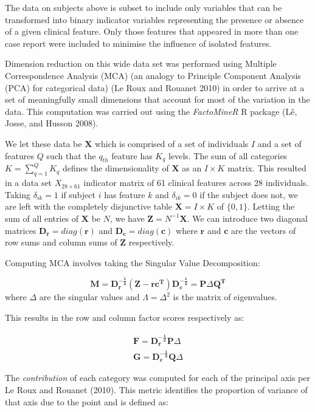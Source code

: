 \documentclass[
  letterpaper,
  DIV=11,
  numbers=noendperiod]{scrartcl}
\begin{document}
The data on subjects above is subset to include only variables that can
be transformed into binary indicator variables representing the presence
or absence of a given clinical feature. Only those features that
appeared in more than one case report were included to minimise the
influence of isolated features.

Dimension reduction on this wide data set was performed using Multiple
Correspondence Analysis (MCA) (an analogy to Principle Component
Analysis (PCA) for categorical data) (Le Roux and Rouanet 2010) in order
to arrive at a set of meaningfully small dimensions that account for
most of the variation in the data. This computation was carried out
using the \emph{FactoMineR} R package (Lê, Josse, and Husson 2008).

We let these data be \(\mathbf{X}\) which is comprised of a set of
individuals \(I\) and a set of features \(Q\) such that the \(q_{th}\)
feature has \(K_q\) levels. The sum of all categories
\(K = \sum_{q=1}^{Q}K_q\) defines the dimensionality of \(\mathbf{X}\)
as an \(I\times K\) matrix. This resulted in a data set
\(X_{28 \times 61}\) indicator matrix of 61 clinical features across 28
individuals. Taking \(\delta_{ik} = 1\) if subject \(i\) has feature
\(k\) and \(\delta_{ik} = 0\) if the subject does not, we are left with
the completely disjunctive table \(\mathbf{X} = I\times K\) of
\(\{0,1\}\). Letting the sum of all entries of \(\mathbf{X}\) be \(N\),
we have \(\mathbf{Z} = N^{-1}\mathbf{X}\). We can introduce two diagonal
matrices \(\mathbf{D_r} = diag(\mathbf{r})\) and
\(\mathbf{D_c} = diag(\mathbf{c})\) where \(\mathbf{r}\) and
\(\mathbf{c}\) are the vectors of row sums and column sums of
\(\mathbf{Z}\) respectively.

Computing MCA involves taking the Singular Value Decomposition:

\[
\mathbf{M = D_r^{-\frac{1}{2}}(Z-rc^T)D_c^{-\frac{1}{2}}} = \mathbf{P}\Delta\mathbf{Q^T}
\] where \(\Delta\) are the singular values and \(\Lambda = \Delta^2\)
is the matrix of eigenvalues.

This results in the row and column factor scores respectively as:

\[
\begin{split}
\mathbf{F} = \mathbf{D_r^{-\frac{1}{2}}P}\Delta \\
\mathbf{G = D_c^{-\frac{1}{2}}Q}\Delta
\end{split}
\]

The \emph{contribution} of each category was computed for each of the
principal axis per Le Roux and Rouanet (2010). This metric identifies
the proportion of variance of that axis due to the point and is defined
as:
\end{document}
